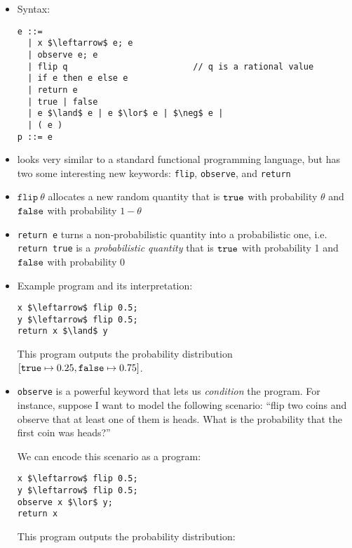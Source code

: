 \documentclass{tufte-handout}
\begin{document}
\begin{itemize}
  \item Syntax:
\begin{lstlisting}[mathescape=true]
  e ::=
  | x $\leftarrow$ e; e
  | observe e; e
  | flip q                         // q is a rational value
  | if e then e else e
  | return e
  | true | false
  | e $\land$ e | e $\lor$ e | $\neg$ e |
  | ( e )
p ::= e
\end{lstlisting}

\item \disc{} looks very similar to a standard functional programming language,
but has two some interesting new keywords: \texttt{flip}, \texttt{observe}, and
\texttt{return}

\item $\texttt{flip}~\theta$ allocates a new random quantity that is $\texttt{true}$
with probability $\theta$ and $\texttt{false}$ with probability $1-\theta$

\item \texttt{return e} turns a non-probabilistic quantity into a probabilistic one, i.e. 
\texttt{return true} is a \emph{probabilistic quantity} that is $\texttt{true}$ with probability 1 and 
$\texttt{false}$ with probability 0

\item Example program and its interpretation: 

\begin{lstlisting}[mathescape=true]
x $\leftarrow$ flip 0.5; 
y $\leftarrow$ flip 0.5;
return x $\land$ y
\end{lstlisting}

This program outputs the probability distribution $[\texttt{true} \mapsto 0.25, \texttt{false}
\mapsto 0.75]$.

\item \texttt{observe} is a powerful keyword that lets us \emph{condition} the
program. For instance, suppose I want to model the following scenario: ``flip 
two coins and observe that at least one of them is heads. What is the probability 
that the first coin was heads?''

We can encode this scenario as a \disc{} program:

\begin{lstlisting}[mathescape=true]
x $\leftarrow$ flip 0.5; 
y $\leftarrow$ flip 0.5;
observe x $\lor$ y;
return x
\end{lstlisting}

This program outputs the probability distribution:
\begin{align*}
  [\true \mapsto (0.25 + 0.25) / 0.75, \false
\mapsto 0.25 / 0.75]
\end{align*} 


\end{itemize}
\end{document}
